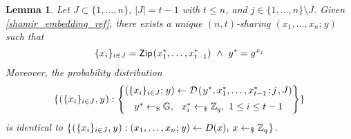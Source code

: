 \documentclass[10pt, psamsfonts, reqno]{amsart}
\newtheorem{lem}[thm]{Lemma}
\theoremstyle{definition}
\theoremstyle{remark}
\numberwithin{equation}{section}
\begin{document}
\begin{lem}\label{shamir_sharing_simulation_lemma}
Let $J \subset \{1, \dots, n\}$, $|J| = t-1$ with $t \le n$,
and $j \in \{1, \dots, n\} \setminus J$.
Given \eqref{shamir_embedding_ref},
there exists a unique $(n, t)$-sharing
$(x_1, \dots, x_n;\hspace{1pt} y)$
such that
\vspace{3pt}
\begin{equation}\label{shamir_sharing_constraint}
\{x_i\}_{i \in J} =
\mathsf{Zip}\hspace{0.75pt}
(\hspace{0.5pt}x_1^*, \dots, x_{t-1}^*)
\ \land
\ y^* = g ^ {x_j}
\vspace{3pt}
\end{equation}
Moreover, the probability distribution
\vspace{5pt}
\begin{equation*}\label{sharing_dist_simulated}
\{\hspace{0.5pt}
(\hspace{0.5pt}\{x_i\}_{i \in J},\hspace{0.5pt} y\hspace{0.5pt}):
\begin{Bmatrix}
(\{x_i\}_{i \in J};\hspace{1pt} y) \leftarrow
\mathcal{D}\hspace{1pt}(
	\hspace{1pt}y^*,
	x_1^*, \dots, x_{t-1}^*
	\hspace{1pt};
	j\hspace{1pt},
	J
)\\[5pt]
y^* \leftarrow_\$ \mathbb{G},
\ \ x_i^* \leftarrow_\$ \mathbb{Z}_q,
\ 1 \le i \le t-1\\[1pt]
\end{Bmatrix}
\}\\[5pt]
\end{equation*}
is identical to
$
\{
\hspace{0.5pt}
(\hspace{0.5pt}\{x_i\}_{i \in J},\hspace{0.5pt} y\hspace{0.5pt}):
(x_1, \dots, x_n;\hspace{1pt} y) \leftarrow D(x),
\hspace{2pt} x \leftarrow_\$ \mathbb{Z}_q
\hspace{0.5pt}
\}
$\hspace{1pt}.
\end{lem}
\end{document}
